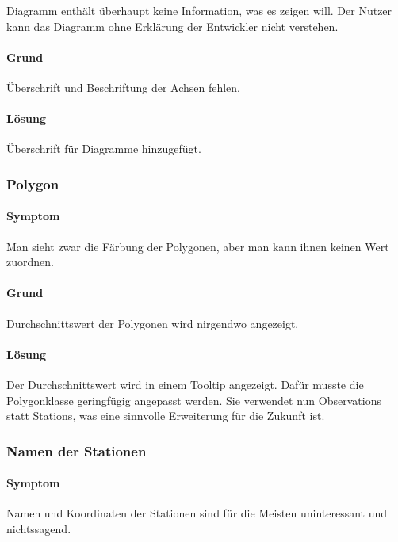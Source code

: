       Diagramm enthält überhaupt keine Information, was es zeigen will. Der Nutzer kann das Diagramm ohne Erklärung der Entwickler nicht verstehen.


      \paragraph{Grund}
      Überschrift und Beschriftung der Achsen fehlen.

      \paragraph{Lösung}
      Überschrift für Diagramme hinzugefügt.

    \subsubsection*{Polygon}
      \paragraph{Symptom}

      Man sieht zwar die Färbung der Polygonen, aber man kann ihnen keinen Wert zuordnen.


      \paragraph{Grund}
      Durchschnittswert der Polygonen wird nirgendwo angezeigt.

      \paragraph{Lösung}
      Der Durchschnittswert wird in einem Tooltip angezeigt. Dafür musste die Polygonklasse geringfügig
      angepasst werden. Sie verwendet nun Observations statt Stations, was eine sinnvolle Erweiterung für die Zukunft ist.


    \subsubsection*{Namen der Stationen}
      \paragraph{Symptom}

      Namen und Koordinaten der Stationen sind für die Meisten uninteressant und nichtssagend.
      

